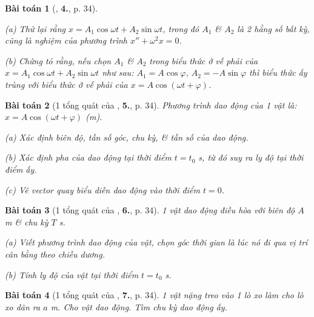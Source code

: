 \documentclass{article}
\numberwithin{equation}{section}
\newtheorem{baitoan}{Bài toán}[section]
\begin{document}
\begin{baitoan}[\cite{SGK_Vat_Ly_12_nang_cao}, \textbf{4.}, p. 34]
	\begin{enumerate*}
		\item[(a)] Thử lại rằng $x = A_1\cos\omega t + A_2\sin\omega t$, trong đó $A_1$ \& $A_2$ là 2 hằng số bất kỳ, cũng là nghiệm của phương trình $x'' + \omega^2x = 0$.
		\item[(b)] Chứng tỏ rằng, nếu chọn $A_1$ \& $A_2$ trong biểu thức ở vế phải của $x = A_1\cos\omega t + A_2\sin\omega t$ như sau: $A_1 = A\cos\varphi$, $A_2 = -A\sin\varphi$ thì biểu thức ấy trùng với biểu thức ở vế phải của $x = A\cos(\omega t + \varphi)$.
	\end{enumerate*}
\end{baitoan}

\begin{baitoan}[1 tổng quát của \cite{SGK_Vat_Ly_12_nang_cao}, \textbf{5.}, p. 34]
	Phương trình dao động của 1 vật là: $x = A\cos(\omega t + \varphi)$ (m).
	\begin{enumerate*}
		\item[(a)] Xác định biên độ, tần số góc, chu kỳ, \& tần số của dao động.
		\item[(b)] Xác định pha của dao động tại thời điểm $t = t_0$ s, từ đó suy ra ly độ tại thời điểm ấy.
		\item[(c)] Vẽ vector quay biểu diễn dao động vào thời điểm $t = 0$.
	\end{enumerate*}
\end{baitoan}

\begin{baitoan}[1 tổng quát của \cite{SGK_Vat_Ly_12_nang_cao}, \textbf{6.}, p. 34]
	1 vật dao động điều hòa với biên độ $A$ m \& chu kỳ $T$ s.
	\begin{enumerate*}
		\item[(a)] Viết phương trình dao động của vật, chọn góc thời gian là lúc nó đi qua vị trí cân bằng theo chiều dương.
		\item[(b)] Tính ly độ của vật tại thời điểm $t = t_0$ s.
	\end{enumerate*}
\end{baitoan}

\begin{baitoan}[1 tổng quát của \cite{SGK_Vat_Ly_12_nang_cao}, \textbf{7.}, p. 34]
	1 vật nặng treo vào 1 lò xo làm cho lò xo dãn ra $a$ m. Cho vật dao động. Tìm chu kỳ dao động ấy.
\end{baitoan}

\end{document}

